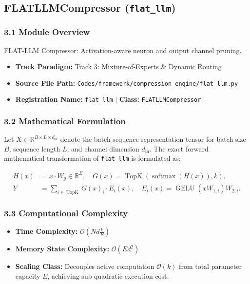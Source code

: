 \subsection{FLATLLMCompressor (\texttt{flat\_llm})}
\label{sec:app_module_flat\_llm}

\subsubsection*{3.1 Module Overview}
FLAT-LLM Compressor: Activation-aware neuron and output channel pruning.
\begin{itemize}
    \item \textbf{Track Paradigm:} Track 3: Mixture-of-Experts & Dynamic Routing
    \item \textbf{Source File Path:} \texttt{Codes/framework/compression\_engine/flat\_llm.py}
    \item \textbf{Registration Name:} \texttt{flat\_llm} $\mid$ \textbf{Class:} \texttt{FLATLLMCompressor}
\end{itemize}

\subsubsection*{3.2 Mathematical Formulation}
Let $X \in \mathbb{R}^{B \times L \times d_{\text{in}}}$ denote the batch sequence representation tensor for batch size $B$, sequence length $L$, and channel dimension $d_{\text{in}}$. The exact forward mathematical transformation of \texttt{flat\_llm} is formulated as:

\begin{align}
H(x) &= x \cdot W_g \in \mathbb{R}^{E}, \quad G(x) = \operatorname{TopK}\left(\operatorname{softmax}(H(x)), k\right), \\
Y &= \sum_{i \in \operatorname{TopK}} G(x)_i \cdot E_i(x), \quad E_i(x) = \operatorname{GELU}(x W_{1, i}) W_{2, i}.
\end{align}


\subsubsection*{3.3 Computational Complexity}
\begin{itemize}
    \item \textbf{Time Complexity:} $\mathcal{O}(N d \frac{k}{E})$
    \item \textbf{Memory State Complexity:} $\mathcal{O}(E d^2)$
    \item \textbf{Scaling Class:} Decouples active computation $\mathcal{O}(k)$ from total parameter capacity $E$, achieving sub-quadratic execution cost.
\end{itemize}

